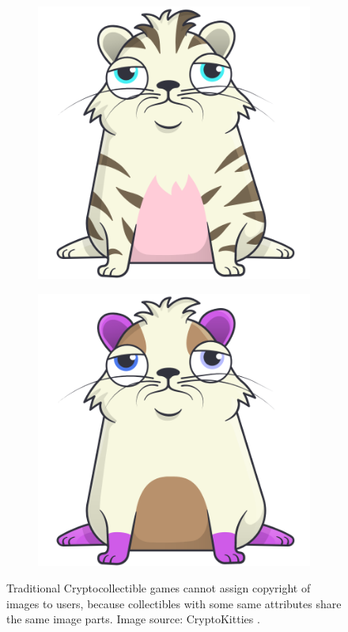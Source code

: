 \documentclass[a4paper]{article}
\begin{document}
\begin{figure}[!h]
\begin{subfigure}{0.5\textwidth}
  \includegraphics[width=\textwidth]{870796.png}
\end{subfigure}\hspace*{\fill}
\begin{subfigure}{0.5\textwidth}
  \includegraphics[width=\textwidth]{871240.png}
\end{subfigure}

\caption{
Traditional Cryptocollectible games cannot assign copyright of images to users, because collectibles with some same attributes share the same image parts. Image source: CryptoKitties \cite{cryptokitties}.
}
\end{figure}
\end{document}
